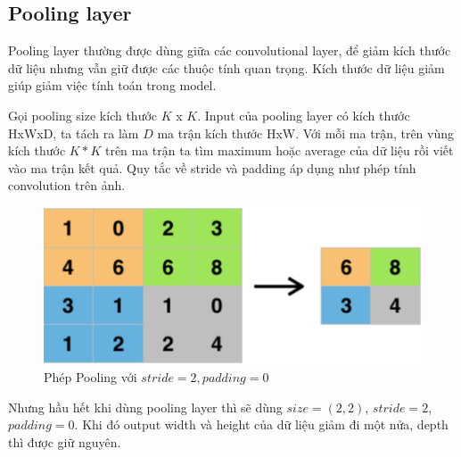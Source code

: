 \subsection{Pooling layer}
\label{ss:Pooling}
Pooling layer thường được dùng giữa các convolutional layer, để giảm kích thước dữ liệu nhưng vẫn giữ được các thuộc tính quan trọng. Kích thước dữ liệu giảm giúp giảm việc tính toán trong model.

Gọi pooling size kích thước $K$ x $K$. Input của pooling layer có kích thước HxWxD, ta tách ra làm $D$ ma trận kích thước HxW. Với mỗi ma trận, trên vùng kích thước $K*K$ trên ma trận ta tìm maximum hoặc average của dữ liệu rồi viết vào ma trận kết quả. Quy tắc về stride và padding áp dụng như phép tính convolution trên ảnh.

\FloatBarrier
\begin{figure}[htp]
\begin{center}
\includegraphics[scale=0.3]{chap2/c2_figs/9.jpg}
\end{center}
\caption{Phép Pooling với $stride=2, padding=0$}
\label{fig:pooling}
\end{figure}
\FloatBarrier

Nhưng hầu hết khi dùng pooling layer thì sẽ dùng $size=(2,2)$, $stride=2$, $padding=0$. Khi đó output width và height của dữ liệu giảm đi một nửa, depth thì được giữ nguyên.

